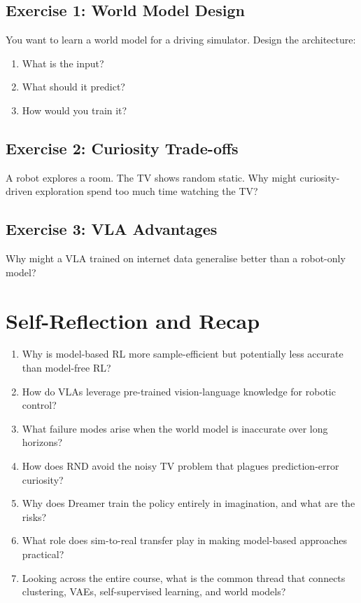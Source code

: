 \subsection{Exercise 1: World Model Design}

You want to learn a world model for a driving simulator. Design the architecture:
\begin{enumerate}
    \item What is the input?
    \item What should it predict?
    \item How would you train it?
\end{enumerate}

\subsection{Exercise 2: Curiosity Trade-offs}

A robot explores a room. The TV shows random static. Why might curiosity-driven exploration spend too much time watching the TV?

\subsection{Exercise 3: VLA Advantages}

Why might a VLA trained on internet data generalise better than a robot-only model?

\fi

\section{Self-Reflection and Recap}


\begin{enumerate}
    \item Why is model-based RL more sample-efficient but potentially less accurate than model-free RL?
    \item How do VLAs leverage pre-trained vision-language knowledge for robotic control?
    \item What failure modes arise when the world model is inaccurate over long horizons?
    \item How does RND avoid the noisy TV problem that plagues prediction-error curiosity?
    \item Why does Dreamer train the policy entirely in imagination, and what are the risks?
    \item What role does sim-to-real transfer play in making model-based approaches practical?
    \item Looking across the entire course, what is the common thread that connects clustering, VAEs, self-supervised learning, and world models?
\end{enumerate}


